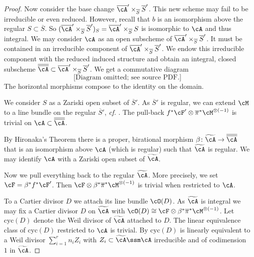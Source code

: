 \begin{proof}
Now consider the base change $\overline
\cA'\times_{\overline S}\overline S'$. This new scheme
may  fail to be irreducible or even
reduced. However, recall that $b$ is an isomorphism above the regular $S\subset
\overline S$. So $(\overline
\cA'\times_{\overline S}\overline S')_S =
\overline{\cA}'\times_{\overline S}S$  is isomorphic to $\cA$ and thus
integral. We may consider $\cA$ as an open subscheme of
$\overline
\cA'\times_{\overline S}\overline S'$. It must be contained in an irreducible component of
$\overline
\cA'\times_{\overline S}\overline S'$. We endow this irreducible component with the
reduced induced structure and obtain an integral, closed subscheme
$\overline{\overline{\cA}}\subset \overline
\cA'\times_{\overline S}\overline S'$. We get a commutative diagram
\begin{equation*}
  \text{[Diagram omitted; see source PDF.]}
\end{equation*}
The horizontal  morphisms compose to the identity on the domain. %

We consider $S$ as a Zariski open subset of $\overline S'$.
As $\overline S'$ is regular, we can extend $\cM$ to a line bundle on
the regular $\overline S'$, \textit{cf.} \cite[Corollary~11.41]{GoertzWedhorn}. %
The pull-back $f^*\cF'\otimes\overline\pi^*\cM^{\otimes(-1)}$ is
trivial on $\cA\subset\overline{\overline{\cA}}$.

By Hironaka's Theorem there is a proper, birational morphism $\beta\colon\widetilde
{\cA}\rightarrow\overline{\overline\cA}$ that is an isomorphism above $\cA$
(which is regular)
such that $\widetilde{\cA}$ is regular. We may identify $\cA$ with a Zariski open subset of
$\widetilde \cA$.

Now we pull everything back to the regular  $\widetilde\cA$.
More precisely, we set $\cF = \beta^*f^*\cF'$.
Then
$\cF\otimes\beta^*\overline\pi^*\cM^{\otimes(-1)}$ is trivial when restricted to
$\cA$.

To a Cartier divisor $D$ we attach its line bundle $\cO(D)$.
As $\widetilde \cA$ is integral we may fix a Cartier divisor $D$ on
$\widetilde \cA$ with $\cO(D) \cong \cF\otimes \beta^*\overline\pi^*
\cM^{\otimes(-1)}$. Let $\mathrm{cyc}(D)$ denote the Weil divisor of $\widetilde\cA$
attached to $D$. The linear equivalence class of $\mathrm{cyc}(D)$
restricted to $\cA$ is trivial. By \cite[Proposition~11.40]{GoertzWedhorn}
$\mathrm{cyc}(D)$ is linearly equivalent to a Weil divisor $\sum_{i=1}^r n_i
Z_i$ with  $Z_i \subset\widetilde{\cA}\ssm \cA$ irreducible and of
codimension $1$ in $\widetilde{\cA}$.


\end{proof}
